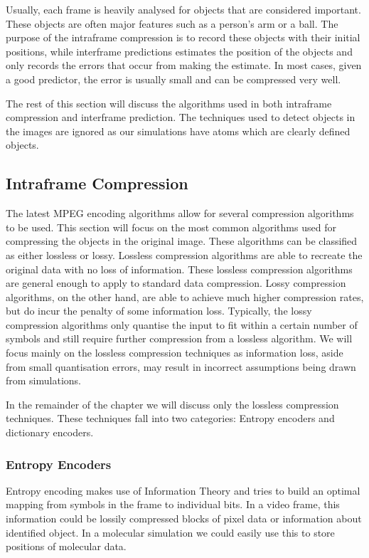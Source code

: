 \documentclass[a4paper,11pt]{report}
\begin{document}
Usually, each frame is heavily analysed for objects that are considered important. These objects are often major features such as a person's arm or a ball. The purpose of the intraframe compression is to record these objects with their initial positions, while interframe predictions estimates the position of the objects and only records the errors that occur from making the estimate. In most cases, given a good predictor, the error is usually small and can be compressed very well.

The rest of this section will discuss the algorithms used in both intraframe compression and interframe prediction. The techniques used to detect objects in the images are ignored as our simulations have atoms which are clearly defined objects.

\subsection{Intraframe Compression}
\label{back_intra}

The latest MPEG encoding algorithms allow for several compression algorithms to be used\cite{gall1991mvc}. This section will focus on the most common algorithms used for compressing the objects in the original image. These algorithms can be classified as either lossless or lossy. Lossless compression algorithms are able to recreate the original data with no loss of information. These lossless compression algorithms are general enough to apply to standard data compression. Lossy compression algorithms, on the other hand, are able to achieve much higher compression rates, but do incur the penalty of some information loss. Typically, the lossy compression algorithms only quantise the input to fit within a certain number of symbols and still require further compression from a lossless algorithm. We will focus mainly on the lossless compression techniques as information loss, aside from small quantisation errors, may result in incorrect assumptions being drawn from simulations.  

In the remainder of the chapter we will discuss only the lossless compression techniques. These techniques fall into two categories: Entropy encoders and dictionary encoders. 

\subsubsection{Entropy Encoders}

Entropy encoding makes use of Information Theory and tries to build an optimal mapping from symbols in the frame to individual bits. In a video frame, this information could be lossily compressed blocks of pixel data or information about identified object. In a molecular simulation we could easily use this to store positions of molecular data.
\end{document}
